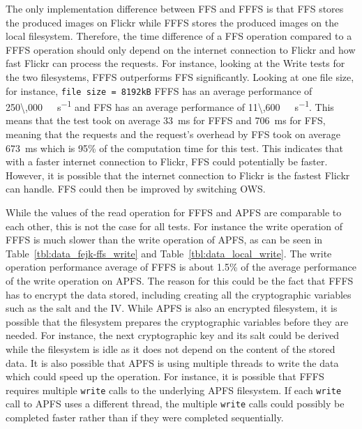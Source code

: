 The only implementation difference between \gls{FFS} and \gls{FFFS} is that \gls{FFS} stores the produced images on Flickr while \gls{FFFS} stores the produced images on the local filesystem. Therefore, the time difference of a \gls{FFS} operation compared to a \gls{FFFS} operation should only depend on the internet connection to Flickr and how fast Flickr can process the requests. For instance, looking at the Write tests for the two filesystems, \gls{FFFS} outperforms \gls{FFS} significantly. Looking at one file size, for instance, \texttt{file size = 8192kB} \gls{FFFS} has an average performance of \SI[per-mode = symbol]{250\,000}{\kilo\byte\per\second} and \gls{FFS} has an average performance of \SI[per-mode = symbol]{11\,600}{\kilo\byte\per\second}. This means that the test took on average \SI{33}{\milli\second} for \gls{FFFS} and \SI{706}{\milli\second} for \gls{FFS}, meaning that the requests and the request's overhead by \gls{FFS} took on average \SI{673}{\milli\second} which is 95\% of the computation time for this test. This indicates that with a faster internet connection to Flickr, \gls{FFS} could potentially be faster. However, it is possible that the internet connection to Flickr is the fastest Flickr can handle. \gls{FFS} could then be improved by switching \gls{OWS}.

While the values of the read operation for \gls{FFFS} and \gls{APFS} are comparable to each other, this is not the case for all tests. For instance the write operation of \gls{FFFS} is much slower than the write operation of \gls{APFS}, as can be seen in Table~\ref{tbl:data_fejk-ffs_write} and Table~\ref{tbl:data_local_write}. The write operation performance average of \gls{FFFS} is about 1.5\% of the average performance of the write operation on \gls{APFS}. The reason for this could be the fact that \gls{FFFS} has to encrypt the data stored, including creating all the cryptographic variables such as the salt and the \gls{IV}. While \gls{APFS} is also an encrypted filesystem, it is possible that the filesystem prepares the cryptographic variables before they are needed. For instance, the next cryptographic key and its salt could be derived while the filesystem is idle as it does not depend on the content of the stored data. It is also possible that \gls{APFS} is using multiple threads to write the data which could speed up the operation. For instance, it is possible that \gls{FFFS} requires multiple \texttt{write} calls to the underlying \gls{APFS} filesystem. If each \texttt{write} call to \gls{APFS} uses a different thread, the multiple \texttt{write} calls could possibly be completed faster rather than if they were completed sequentially. 

